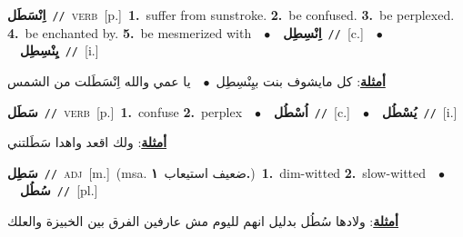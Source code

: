 \documentclass[10pt,a4paper,twoside]{article} %
\begin{document}
\begin{multicols}{2}
{\setlength\topsep{0pt}\textbf{\foreignlanguage{arabic}{اِنْسَطَل}}\ {\color{gray}\texttt{//}\color{black}}\ \textsc{verb}\ [p.]\ \textbf{1.}~suffer from sunstroke.  \textbf{2.}~be confused.  \textbf{3.}~be perplexed.  \textbf{4.}~be enchanted by.  \textbf{5.}~be mesmerized with\ \ $\bullet$\ \ \setlength\topsep{0pt}\textbf{\foreignlanguage{arabic}{اِنْسِطِل}}\ {\color{gray}\texttt{//}\color{black}}\ [c.]\ \ $\bullet$\ \ \setlength\topsep{0pt}\textbf{\foreignlanguage{arabic}{يِنْسِطِل}}\ {\color{gray}\texttt{//}\color{black}}\ [i.]\  \begin{flushright}\color{gray}\foreignlanguage{arabic}{\textbf{\underline{\foreignlanguage{arabic}{أمثلة}}}: كل مايشوف بنت بيِنْسِطِل\ $\bullet$\ \  يا عمي والله اِنْسَطَلت من الشمس}\end{flushright}\color{black}} \vspace{2mm}

{\setlength\topsep{0pt}\textbf{\foreignlanguage{arabic}{سَطَل}}\ {\color{gray}\texttt{//}\color{black}}\ \textsc{verb}\ [p.]\ \textbf{1.}~confuse  \textbf{2.}~perplex\ \ $\bullet$\ \ \setlength\topsep{0pt}\textbf{\foreignlanguage{arabic}{اُسْطُل}}\ {\color{gray}\texttt{//}\color{black}}\ [c.]\ \ $\bullet$\ \ \setlength\topsep{0pt}\textbf{\foreignlanguage{arabic}{يُسْطُل}}\ {\color{gray}\texttt{//}\color{black}}\ [i.]\  \begin{flushright}\color{gray}\foreignlanguage{arabic}{\textbf{\underline{\foreignlanguage{arabic}{أمثلة}}}: ولك اقعد واهدا سَطَلتني}\end{flushright}\color{black}} \vspace{2mm}

{\setlength\topsep{0pt}\textbf{\foreignlanguage{arabic}{سَطِل}}\ {\color{gray}\texttt{//}\color{black}}\ \textsc{adj}\ [m.]\ \color{gray}(msa. \foreignlanguage{arabic}{ضعيف استيعاب}~\foreignlanguage{arabic}{\textbf{١.}})\color{black}\ \textbf{1.}~dim-witted  \textbf{2.}~slow-witted\ \ $\bullet$\ \ \setlength\topsep{0pt}\textbf{\foreignlanguage{arabic}{سُطُل}}\ {\color{gray}\texttt{//}\color{black}}\ [pl.]\  \begin{flushright}\color{gray}\foreignlanguage{arabic}{\textbf{\underline{\foreignlanguage{arabic}{أمثلة}}}: ولادها سُطُل بدليل انهم لليوم مش عارفين الفرق بين الخبيزة والعلك}\end{flushright}\color{black}} \vspace{2mm}


\end{multicols}
\end{document}
